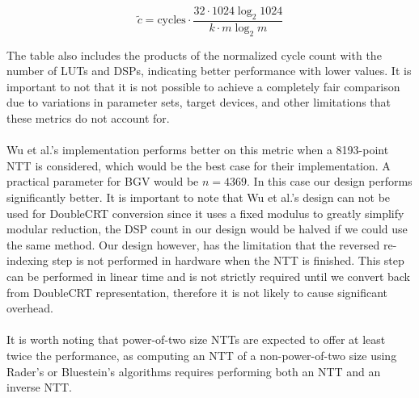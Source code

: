 \documentclass[english,master=eelt,masteroption=ec]{kulemt}
\begin{document}
\begin{equation}
\label{eq:norm_cycles}
\tilde{c}=\text{cycles}\cdot\frac{32 \cdot 1024 \log_2 1024}{k \cdot m \log_2 m}
\end{equation}

The table also includes the products of the normalized cycle count with the number of LUTs and DSPs, indicating better performance with lower values. It is important to not that it is not possible to achieve a completely fair comparison due to variations in parameter sets, target devices, and other limitations that these metrics do not account for.
\\\\
Wu et al.'s implementation performs better on this metric when a 8193-point NTT is considered, which would be the best case for their implementation. A practical parameter for BGV would be $n=4369$. \cite{9937536} In this case our design performs significantly better. It is important to note that Wu et al.'s design can not be used for DoubleCRT conversion since it uses a fixed modulus to greatly simplify modular reduction, the DSP count in our design would be halved if we could use the same method. Our design however, has the limitation that the reversed re-indexing step is not performed in hardware when the NTT is finished. This step can be performed in linear time and is not strictly required until we convert back from DoubleCRT representation, therefore it is not likely to cause significant overhead.
\\\\
It is worth noting that power-of-two size NTTs are expected to offer at least twice the performance, as computing an NTT of a non-power-of-two size using Rader's or Bluestein's algorithms requires performing both an NTT and an inverse NTT.
\end{document}
